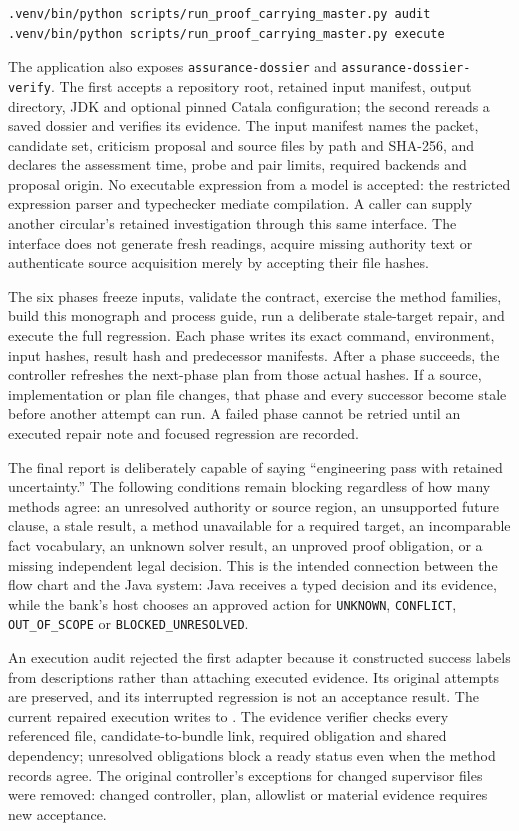 \documentclass[12pt,a4paper,oneside,openany]{book}
\begin{document}
\begin{lstlisting}
.venv/bin/python scripts/run_proof_carrying_master.py audit
.venv/bin/python scripts/run_proof_carrying_master.py execute
\end{lstlisting}

The application also exposes \texttt{assurance-dossier} and
\texttt{assurance-dossier-verify}. The first accepts a repository root, retained
input manifest, output directory, JDK and optional pinned Catala configuration;
the second rereads a saved dossier and verifies its evidence. The input manifest
names the packet, candidate set, criticism proposal and source files by path and
SHA-256, and declares the assessment time, probe and pair limits, required
backends and proposal origin. No executable expression from a model is accepted:
the restricted expression parser and typechecker mediate compilation. A caller
can supply another circular's retained investigation through this same interface.
The interface does not generate fresh readings, acquire missing authority text
or authenticate source acquisition merely by accepting their file hashes.

The six phases freeze inputs, validate the contract, exercise the method
families, build this monograph and process guide, run a deliberate stale-target
repair, and execute the full regression. Each phase writes its exact command,
environment, input hashes, result hash and predecessor manifests. After a
phase succeeds, the controller refreshes the next-phase plan from those actual
hashes. If a source, implementation or plan file changes, that phase and every
successor become stale before another attempt can run. A failed phase cannot be
retried until an executed repair note and focused regression are recorded.

The final report is deliberately capable of saying ``engineering pass with
retained uncertainty.'' The following conditions remain blocking regardless of
how many methods agree: an unresolved authority or source region, an unsupported
future clause, a stale result, a method unavailable for a required target, an
incomparable fact vocabulary, an unknown solver result, an unproved proof
obligation, or a missing independent legal decision. This is the intended
connection between the flow chart and the Java system: Java receives a typed
decision and its evidence, while the bank's host chooses an approved action for
\texttt{UNKNOWN}, \texttt{CONFLICT}, \texttt{OUT\_OF\_SCOPE} or
\texttt{BLOCKED\_UNRESOLVED}.

An execution audit rejected the first adapter because it constructed success
labels from descriptions rather than attaching executed evidence. Its original
attempts are preserved, and its interrupted regression is not an acceptance
result. The current repaired execution writes to
.
The evidence verifier checks every referenced file, candidate-to-bundle link,
required obligation and shared dependency; unresolved obligations block a ready
status even when the method records agree. The original controller's exceptions
for changed supervisor files were removed: changed controller, plan, allowlist
or material evidence requires new acceptance.
\end{document}
